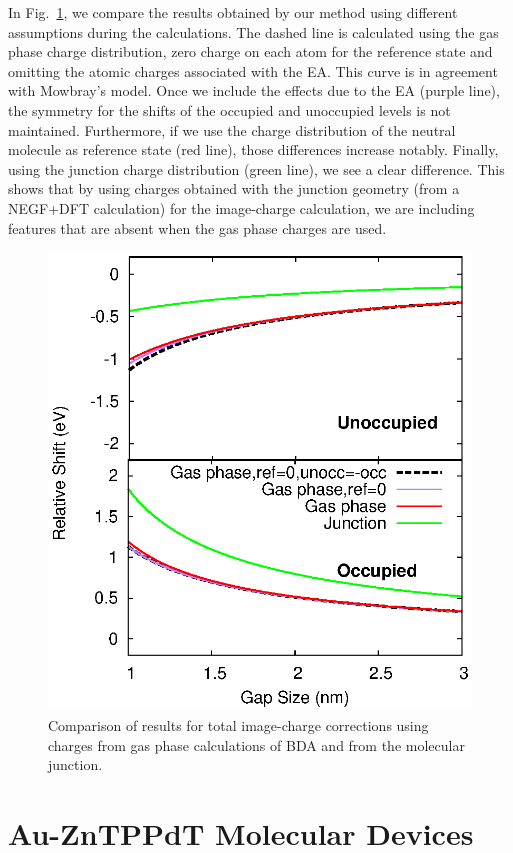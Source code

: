 \documentclass[aip,jcp,a4paper,reprint,floatfix,superscriptaddress]{revtex4-1}
\begin{document}
In Fig.~\ref{fg:gas_vs_junction_BDA}, we compare the results obtained by our method using different assumptions during the calculations. The dashed line is calculated using the gas phase charge distribution, zero charge on each atom for the reference state and omitting the atomic charges associated with the EA. This curve is in agreement with Mowbray's model. Once we include the effects due to the EA (purple line), the symmetry for the shifts of the occupied and unoccupied levels is not maintained. Furthermore, if we use the charge distribution of the neutral molecule as reference state (red line), those differences increase notably. Finally, using the junction charge distribution (green line), we see a clear difference. This shows that by using charges obtained with the junction geometry (from a NEGF+DFT calculation) for the image-charge calculation, we are including features that are absent when the gas phase charges are used.

\begin{figure}
\includegraphics[width=.8\columnwidth]{img/Methods/Us_vs_Mowbraygas_BDA-ref}
\caption{Comparison of results for total image-charge corrections using charges from gas phase calculations of BDA and from the molecular junction.} \label{fg:gas_vs_junction_BDA}
\end{figure}




\section{Au-ZnTPPdT Molecular Devices} \label{Sec:ZnTPP}
\end{document}
